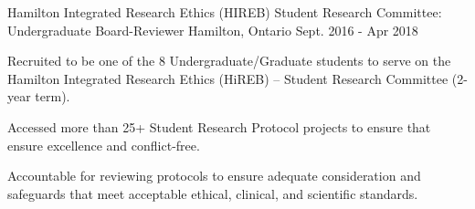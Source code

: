 \begin{cventries}
  \cventry
    {Hamilton Integrated Research Ethics (HIREB)} %
    {Student Research Committee: Undergraduate Board-Reviewer} %
    {Hamilton, Ontario} %
    {Sept. 2016 - Apr 2018} %
     {\renewcommand{\labelitemii}{\bullet}
      \begin{cvitems}%
        \item {Recruited to be one of the 8 Undergraduate/Graduate students to serve on the Hamilton Integrated Research Ethics (HiREB) – Student Research Committee (2-year term).}
        \item {Accessed more than 25+ Student Research Protocol projects to ensure that ensure excellence and conflict-free.}
        \item {Accountable for reviewing protocols to ensure adequate consideration and safeguards that meet acceptable ethical, clinical, and scientific standards.}
      \end{cvitems}
    }




\end{cventries}
